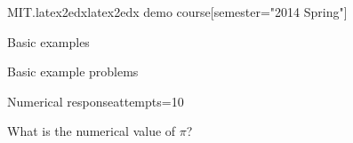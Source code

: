 \documentclass[12pt]{article}
\begin{document}
\begin{edXcourse}{MIT.latex2edx}{latex2edx demo course}[semester="2014 Spring"]

\begin{edXchapter}{Basic examples}

\begin{edXsection}{Basic example problems}

\begin{edXvertical}

\begin{edXproblem}{Numerical response}{attempts=10}

What is the numerical value of $\pi$?


\end{edXproblem}
\end{edXvertical}
\end{edXsection}
\end{edXchapter}
\end{edXcourse}
\end{document}
